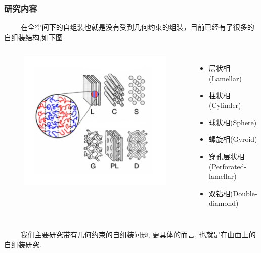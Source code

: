 \documentclass[notheorems,serif]{beamer}
\begin{document}
\begin{frame}
    \frametitle{研究内容}
~~~~ 在全空间下的自组装也就是没有受到几何约束的组装，目前已经有了很多的自组装结构,如下图

\begin{columns}

        \column{6cm}

    \begin{figure}
        \centering
        \includegraphics[scale=0.30]{figures/mesh/scft-AB.png}
    \end{figure}
\column{8cm}
    \begin{itemize}
        \item 层状相(Lamellar)
        \item 柱状相(Cylinder)
        \item 球状相(Sphere)
        \item 螺旋相(Gyroid)
        \item 穿孔层状相(Perforated-lamellar)
        \item 双钻相(Double-diamond) 
    \end{itemize}
\end{columns}
~~~~ 我们主要研究带有几何约束的自组装问题, 更具体的而言, 也就是在曲面上的自组装研究. 
\end{frame}
\end{document}
